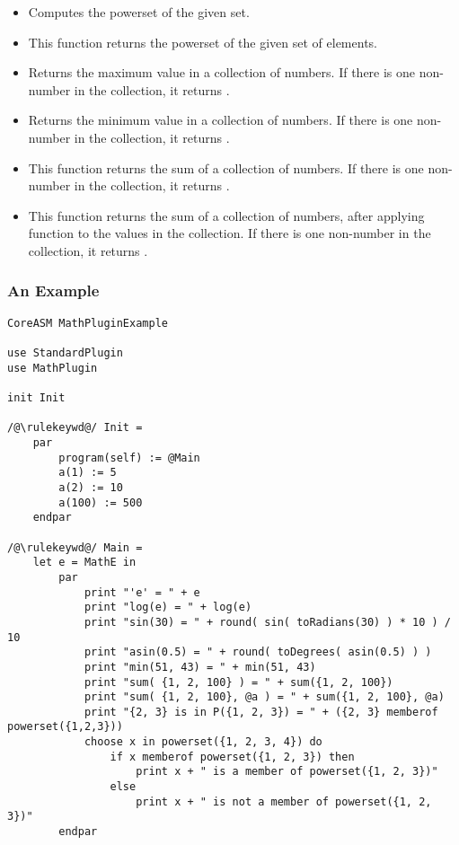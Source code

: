 \documentclass{article}
\begin{document}
\begin{itemize}
\item {\bf {} }  Computes the powerset of the given set. 

\item {\bf {} } This function returns the powerset of the given set of elements.

\item {\bf {} }  Returns the maximum value in a collection of numbers. 
	If there is one non-number in the collection, it returns .

\item {\bf {} }  Returns the minimum value in a collection of numbers.
	If there is one non-number in the collection, it returns .

\item {\bf {} }   This function returns the sum of a collection of numbers. 
	If there is one non-number in the collection, it returns .

\item {\bf {} }   This function returns the sum of a collection of numbers, 
	after applying function {\bf {}} to the values in the collection. If there is one non-number 
	in the collection, it returns .

\end{itemize}

\subsubsection{An Example}

\begin{tcolorbox}[boxrule=0.0pt,colback=gray!5!white,title={Using Math Plugin},label={spec:mathexample}]
\begin{lstlisting}[backgroundcolor=\color{gray!5!white},frame=none]
CoreASM MathPluginExample

use StandardPlugin
use MathPlugin

init Init

/@\rulekeywd@/ Init =
	par
		program(self) := @Main
		a(1) := 5
		a(2) := 10
		a(100) := 500
	endpar

/@\rulekeywd@/ Main =
	let e = MathE in
		par
			print "'e' = " + e
			print "log(e) = " + log(e)
			print "sin(30) = " + round( sin( toRadians(30) ) * 10 ) / 10
			print "asin(0.5) = " + round( toDegrees( asin(0.5) ) )
			print "min(51, 43) = " + min(51, 43)
			print "sum( {1, 2, 100} ) = " + sum({1, 2, 100})
			print "sum( {1, 2, 100}, @a ) = " + sum({1, 2, 100}, @a)
			print "{2, 3} is in P({1, 2, 3}) = " + ({2, 3} memberof powerset({1,2,3}))
			choose x in powerset({1, 2, 3, 4}) do
				if x memberof powerset({1, 2, 3}) then
					print x + " is a member of powerset({1, 2, 3})"
				else
					print x + " is not a member of powerset({1, 2, 3})"
		endpar
\end{lstlisting}
\end{tcolorbox}
\end{document}
